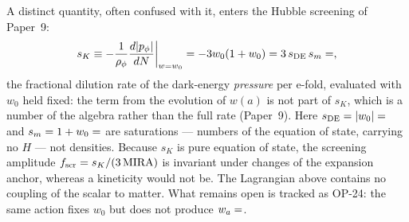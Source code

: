 \documentclass[aps,prd,preprint,amsmath,amssymb,nofootinbib,longbibliography]{revtex4-2}
\begin{document}
A distinct quantity, often confused with it, enters the Hubble screening of
Paper~9:
%
\begin{equation}
  s_K \equiv -\frac{1}{\rho_\phi}\frac{d|p_\phi|}{dN}\bigg|_{w=w_0} = -3w_0(1+w_0)
      = 3\,s_{\rm DE}\,s_m = \val{S_K_d6} ,
  \label{eq:sK_sealed}
\end{equation}
%
the fractional dilution rate of the dark-energy \emph{pressure} per e-fold,
evaluated with $w_0$ held fixed: the term from the evolution of $w(a)$ is not part
of $s_K$, which is a number of the algebra rather than the full rate (Paper~9).
Here $s_{\rm DE}=|w_0|=\val{S_DE_d6}$ and $s_m=1+w_0=\val{S_M_d6}$ are saturations ---
numbers of the equation of state, carrying no $H$ --- not densities. Because
$s_K$ is pure equation of state, the screening amplitude
$f_{\rm scr}=s_K/(3\,\mathrm{MIRA})$ is invariant under changes of the expansion
anchor, whereas a kineticity would not be. The Lagrangian above contains no
coupling of the scalar to matter. What remains open is tracked as OP-24: the
same action fixes $w_0$ but does not produce $w_a=\val{WA_d6}$.
\end{document}
